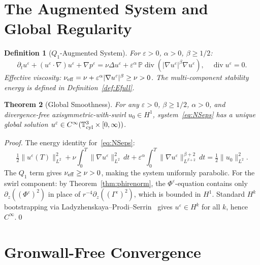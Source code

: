 \documentclass[11pt]{article}
\newtheorem{theorem}{Theorem}[section]
\newtheorem{definition}[theorem]{Definition}
\newcommand{\eps}{\varepsilon}
\newcommand{\norm}[2]{\|{#1}\|_{#2}}
\newcommand{\PP}{\mathbb{P}}
\begin{document}
\section{The Augmented System and Global Regularity}
\label{sec:augmented}

\begin{definition}[$Q_1$-Augmented System]\label{def:aug}
For $\eps>0$, $\alpha>0$, $\beta\geq 1/2$:
\begin{equation}\label{eq:NSeps}
  \partial_t u^\eps + (u^\eps\cdot\nabla)u^\eps + \nabla p^\eps
  = \nu\Delta u^\eps
  + \eps^\alpha\,\PP\operatorname{div}(|\nabla u^\eps|^\beta\nabla u^\eps),
  \quad\operatorname{div}u^\eps=0.
\end{equation}
Effective viscosity: $\nu_{\rm eff}=\nu+\eps^\alpha|\nabla u^\eps|^\beta\geq\nu>0$.  The multi-component stability energy is defined in Definition~\ref{def:Efull}.
\end{definition}

\begin{theorem}[Global Smoothness]\label{thm:global}
For any $\eps>0$, $\beta\geq 1/2$, $\alpha>0$, and divergence-free
axisymmetric-with-swirl $u_0\in H^1$, system~\eqref{eq:NSeps} has a unique
global solution $u^\eps\in C^\infty(\mathbb{T}^3_{\rm cyl}\times[0,\infty))$.
\end{theorem}

\begin{proof}
The energy identity for~\eqref{eq:NSeps}:
\[
  \tfrac{1}{2}\norm{u^\eps(T)}{L^2}^2
  + \nu\!\int_0^T\!\norm{\nabla u^\eps}{L^2}^2\,dt
  + \eps^\alpha\!\int_0^T\!\norm{\nabla u^\eps}{L^{\beta+2}}^{\beta+2}\,dt
  = \tfrac{1}{2}\norm{u_0}{L^2}^2.
\]
The $Q_1$ term gives $\nu_{\rm eff}\geq\nu>0$, making the system
uniformly parabolic. For the swirl component: by Theorem~\ref{thm:phirenorm},
the $\Phi^\eps$-equation contains only $\partial_z((\Phi^\eps)^2)$
in place of $r^{-4}\partial_z((\Gamma^\eps)^2)$, which is bounded in $H^1$.
Standard $H^k$ bootstrapping via Ladyzhenskaya--Prodi--Serrin~\cite{BCD2011}
gives $u^\eps\in H^k$ for all $k$, hence $C^\infty$.\qed
\end{proof}

\section{Gronwall-Free Convergence}
\label{sec:convergence}
\end{document}
